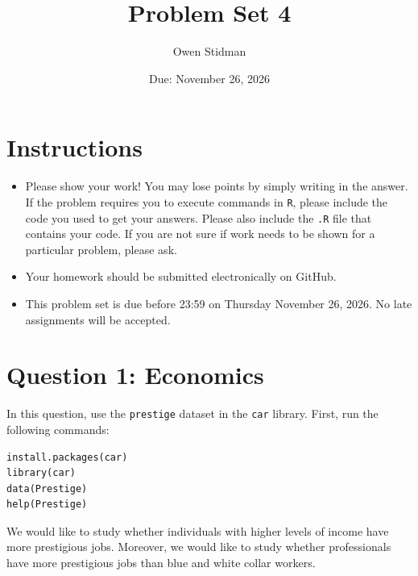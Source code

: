 \documentclass[12pt,letterpaper]{article}
\title{Problem Set 4}
\date{Due: November 26, 2026}
\author{Owen Stidman}
\begin{document}
	\maketitle
	\section*{Instructions}
	\begin{itemize}
		\item Please show your work! You may lose points by simply writing in the answer. If the problem requires you to execute commands in \texttt{R}, please include the code you used to get your answers. Please also include the \texttt{.R} file that contains your code. If you are not sure if work needs to be shown for a particular problem, please ask.
		\item Your homework should be submitted electronically on GitHub.
		\item This problem set is due before 23:59 on Thursday November 26, 2026. No late assignments will be accepted.
	\end{itemize}



	\vspace{.5cm}
\section*{Question 1: Economics}
\vspace{.25cm}
\noindent 	
In this question, use the \texttt{prestige} dataset in the \texttt{car} library. First, run the following commands:

\begin{verbatim}
install.packages(car)
library(car)
data(Prestige)
help(Prestige)
\end{verbatim} 


\noindent We would like to study whether individuals with higher levels of income have more prestigious jobs. Moreover, we would like to study whether professionals have more prestigious jobs than blue and white collar workers.
\end{document}

